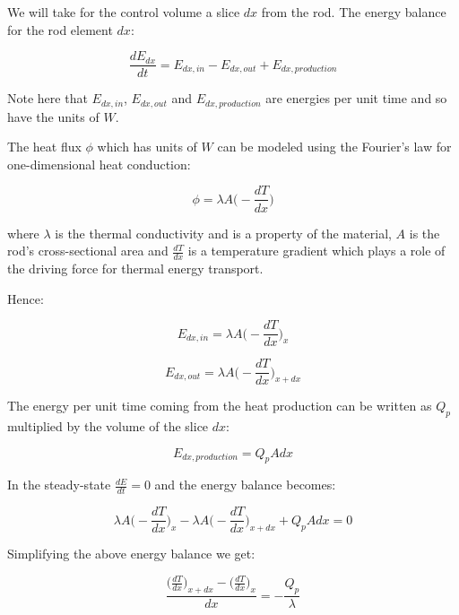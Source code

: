 \documentclass[10pt]{article}
\begin{document}
We will take for the control volume a slice $dx$ from the rod.  The energy balance for the rod element $dx$:

\begin{equation}
\frac{dE_{dx}}{dt} = E_{dx, in} - E_{dx, out} + E_{dx, production}
\end{equation}

Note here that $E_{dx, in}$, $E_{dx, out}$ and $E_{dx, production}$ are energies per unit time and so have the units of $W$.

The heat flux $\phi$ which has units of $W$ can be modeled using the Fourier's law for one-dimensional heat conduction:

\begin{equation}
\phi = \lambda A \Big(- \frac{dT}{dx} \Big)
\label{eq:fourier}
\end{equation}

where $\lambda$ is the thermal conductivity and is a property of the material, $A$ is the rod's cross-sectional area and $\frac{dT}{dx}$ is a temperature gradient which plays a role of the driving force for thermal energy transport.

Hence:

\begin{equation}
E_{dx, in} = \lambda A \Big(- \frac{dT}{dx} \Big)_x
\end{equation}

\begin{equation}
E_{dx, out} = \lambda A \Big(- \frac{dT}{dx} \Big)_{x + dx}
\end{equation}

The energy per unit time coming from the heat production can be written as $Q_p$ multiplied by the volume of the slice $dx$:

\begin{equation}
E_{dx, production} = Q_p A dx
\end{equation}

In the steady-state $\frac{dE}{dt} = 0$ and the energy balance becomes:

\begin{equation}
\lambda A \Big(- \frac{dT}{dx} \Big)_x - \lambda A \Big(- \frac{dT}{dx} \Big)_{x + dx} + Q_p A dx = 0
\end{equation}

Simplifying the above energy balance we get:

\begin{equation*}
\frac{\Big(\frac{dT}{dx} \Big)_{x + dx} - \Big(\frac{dT}{dx} \Big)_x  }{dx} = - \frac{Q_p}{\lambda}
\end{equation*}
\end{document}
